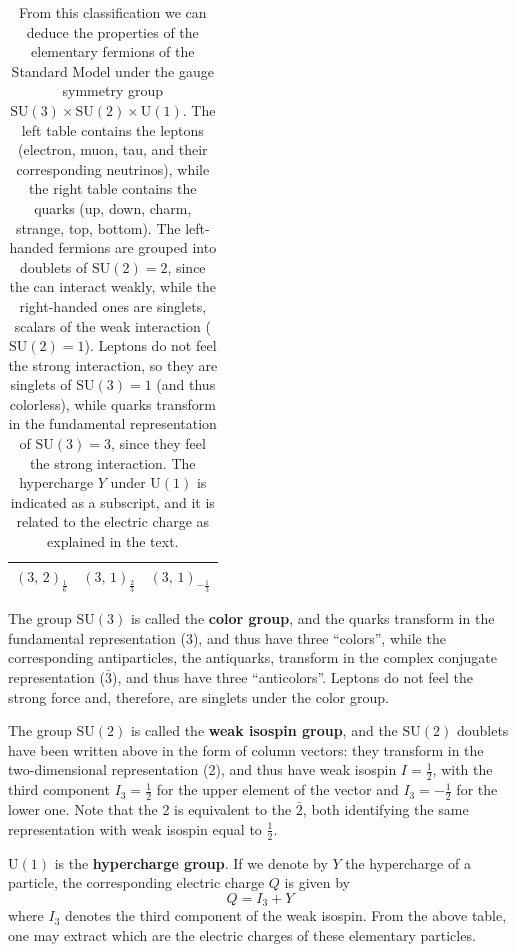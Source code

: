 \begin{table}[H]
\begin{minipage}{0.45\textwidth}
\begin{tabular}{ccc}
            \midrule
            \((3,\,2)_{\frac{1}{6}}\) & \((3,\,1)_{\frac{2}{3}}\) & \((3,\,1)_{-\frac{1}{3}}\) \\
            \bottomrule
        \end{tabular}
    \end{minipage}
    \caption{From this classification we can deduce the properties of the elementary fermions of the Standard Model under the gauge symmetry group \(\mathrm{SU}(3) \times \mathrm{SU}(2) \times \mathrm{U}(1)\). The left table contains the leptons (electron, muon, tau, and their corresponding neutrinos), while the right table contains the quarks (up, down, charm, strange, top, bottom).
        The left-handed fermions are grouped into doublets of \(\mathrm{SU}(2) = 2\), since the can interact weakly, while the right-handed ones are singlets, scalars of the weak interaction (\(\mathrm{SU}(2) = 1\)).
        Leptons do not feel the strong interaction, so they are singlets of \(\mathrm{SU}(3) = 1\) (and thus colorless), while quarks transform in the fundamental representation of \(\mathrm{SU}(3) = 3\), since they feel the strong interaction.
        The hypercharge \(Y\) under \(\mathrm{U}(1)\) is indicated as a subscript, and it is related to the electric charge as explained in the text.}
\end{table}

The group \(\mathrm{SU}(3)\) is called the \textbf{color group}, and the quarks transform in the fundamental representation (3), and thus have three ``colors'', while the corresponding antiparticles, the antiquarks, transform in the complex conjugate representation (\(\bar{3}\)), and thus have three ``anticolors''. Leptons do not feel the strong force and, therefore, are singlets under the color group.

The group \(\mathrm{SU}(2)\) is called the \textbf{weak isospin group}, and the \(\mathrm{SU}(2)\) doublets have been written above in the form of column vectors: they transform in the two-dimensional representation (2), and thus have weak isospin \(I = \frac{1}{2}\), with the third component \(I_3 = \frac{1}{2}\) for the upper element of the vector and \(I_3 = -\frac{1}{2}\) for the lower one. Note that the 2 is equivalent to the \(\bar{2}\), both identifying the same representation with weak isospin equal to \(\frac{1}{2}\).

\(\mathrm{U}(1)\) is the \textbf{hypercharge group}. If we denote by \(Y\) the hypercharge of a particle, the corresponding electric charge \(Q\) is given by
\[
    Q = I_3 + Y
\]
where \(I_3\) denotes the third component of the weak isospin. From the above table, one may extract which are the electric charges of these elementary particles.